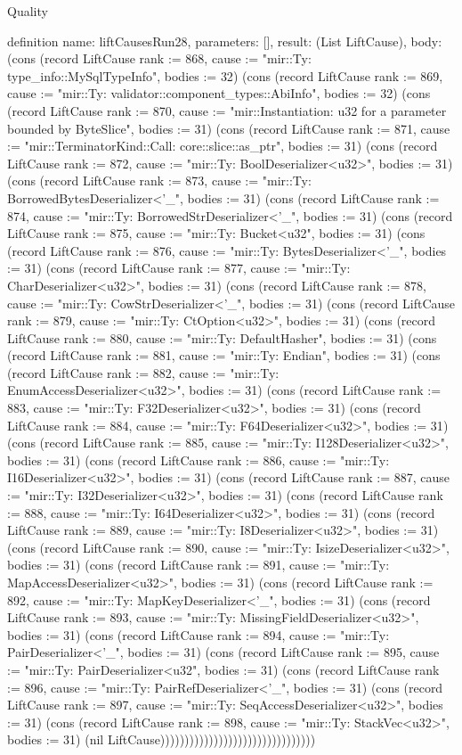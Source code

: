 \begin{lexlean}{Quality}
\begin{semanticmodule}
definition{
  name: liftCausesRun28,
  parameters: [],
  result: (List LiftCause),
  body: (cons (record LiftCause {rank := 868, cause := "mir::Ty: type_info::MySqlTypeInfo", bodies := 32}) (cons (record LiftCause {rank := 869, cause := "mir::Ty: validator::component_types::AbiInfo", bodies := 32}) (cons (record LiftCause {rank := 870, cause := "mir::Instantiation: u32 for a parameter bounded by ByteSlice", bodies := 31}) (cons (record LiftCause {rank := 871, cause := "mir::TerminatorKind::Call: core::slice::as_ptr", bodies := 31}) (cons (record LiftCause {rank := 872, cause := "mir::Ty: BoolDeserializer<u32>", bodies := 31}) (cons (record LiftCause {rank := 873, cause := "mir::Ty: BorrowedBytesDeserializer<'_", bodies := 31}) (cons (record LiftCause {rank := 874, cause := "mir::Ty: BorrowedStrDeserializer<'_", bodies := 31}) (cons (record LiftCause {rank := 875, cause := "mir::Ty: Bucket<u32", bodies := 31}) (cons (record LiftCause {rank := 876, cause := "mir::Ty: BytesDeserializer<'_", bodies := 31}) (cons (record LiftCause {rank := 877, cause := "mir::Ty: CharDeserializer<u32>", bodies := 31}) (cons (record LiftCause {rank := 878, cause := "mir::Ty: CowStrDeserializer<'_", bodies := 31}) (cons (record LiftCause {rank := 879, cause := "mir::Ty: CtOption<u32>", bodies := 31}) (cons (record LiftCause {rank := 880, cause := "mir::Ty: DefaultHasher", bodies := 31}) (cons (record LiftCause {rank := 881, cause := "mir::Ty: Endian", bodies := 31}) (cons (record LiftCause {rank := 882, cause := "mir::Ty: EnumAccessDeserializer<u32>", bodies := 31}) (cons (record LiftCause {rank := 883, cause := "mir::Ty: F32Deserializer<u32>", bodies := 31}) (cons (record LiftCause {rank := 884, cause := "mir::Ty: F64Deserializer<u32>", bodies := 31}) (cons (record LiftCause {rank := 885, cause := "mir::Ty: I128Deserializer<u32>", bodies := 31}) (cons (record LiftCause {rank := 886, cause := "mir::Ty: I16Deserializer<u32>", bodies := 31}) (cons (record LiftCause {rank := 887, cause := "mir::Ty: I32Deserializer<u32>", bodies := 31}) (cons (record LiftCause {rank := 888, cause := "mir::Ty: I64Deserializer<u32>", bodies := 31}) (cons (record LiftCause {rank := 889, cause := "mir::Ty: I8Deserializer<u32>", bodies := 31}) (cons (record LiftCause {rank := 890, cause := "mir::Ty: IsizeDeserializer<u32>", bodies := 31}) (cons (record LiftCause {rank := 891, cause := "mir::Ty: MapAccessDeserializer<u32>", bodies := 31}) (cons (record LiftCause {rank := 892, cause := "mir::Ty: MapKeyDeserializer<'_", bodies := 31}) (cons (record LiftCause {rank := 893, cause := "mir::Ty: MissingFieldDeserializer<u32>", bodies := 31}) (cons (record LiftCause {rank := 894, cause := "mir::Ty: PairDeserializer<'_", bodies := 31}) (cons (record LiftCause {rank := 895, cause := "mir::Ty: PairDeserializer<u32", bodies := 31}) (cons (record LiftCause {rank := 896, cause := "mir::Ty: PairRefDeserializer<'_", bodies := 31}) (cons (record LiftCause {rank := 897, cause := "mir::Ty: SeqAccessDeserializer<u32>", bodies := 31}) (cons (record LiftCause {rank := 898, cause := "mir::Ty: StackVec<u32>", bodies := 31}) (nil LiftCause))))))))))))))))))))))))))))))))
}


\end{semanticmodule}
\end{lexlean}
